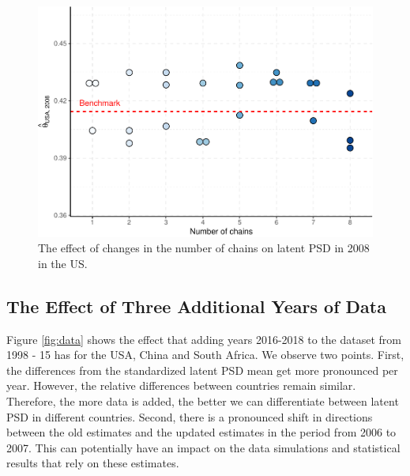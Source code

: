 \documentclass[12pt,english,a4paper,oneside]{article}
\theoremstyle{definition}
\theoremstyle{definition}
\theoremstyle{definition}
\theoremstyle{definition}
\theoremstyle{remark}
\begin{document}
\begin{figure}[H]
\includegraphics[width=\textwidth]{figs/chain-1} \caption[The effect of changes in the number of chains on latent PSD in 2008 in the US]{The effect of changes in the number of chains on latent PSD in 2008 in the US.}\label{fig:chain}
\end{figure}

\hypertarget{the-effect-of-three-additional-years-of-data}{%
\subsection{The Effect of Three Additional Years of Data}\label{the-effect-of-three-additional-years-of-data}}

Figure \ref{fig:data} shows the effect that adding years 2016-2018 to the dataset from 1998 - 15 has for the USA, China and South Africa. We observe two points. First, the differences from the standardized latent PSD mean get more pronounced per year. However, the relative differences between countries remain similar. Therefore, the more data is added, the better we can differentiate between latent PSD in different countries. Second, there is a pronounced shift in directions between the old estimates and the updated estimates in the period from 2006 to 2007. This can potentially have an impact on the data simulations and statistical results that rely on these estimates.
\end{document}
